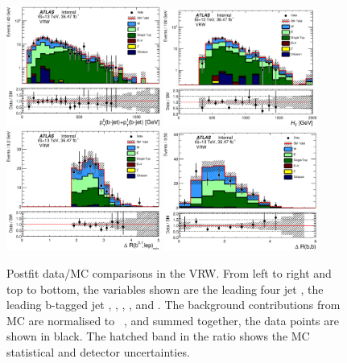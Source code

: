 \begin{figure}[!htb]
  \includegraphics[width=0.45\textwidth]{figures/wJets/postfit/JetPt_JetLeadTagIndex_JetPt_JetSubleadTagIndex__VRW_log.eps}
  \includegraphics[width=0.45\textwidth]{figures/wJets/postfit/Ht_VRW_log.eps}
  \includegraphics[width=0.45\textwidth]{figures/wJets/postfit/MinDRBLep_VRW.eps}
  \includegraphics[width=0.45\textwidth]{figures/wJets/postfit/DRBB_VRW.eps}
  \caption{Postfit data/MC comparisons in the VRW. From left to right and top to bottom, the variables shown are the leading four jet \pt, the leading b-tagged jet \pt, \HT, \htsig, \mindrblep, and \drbjetbjet. The background contributions from MC are normalised to \intlumi\ \ifb, and summed together, the data points are shown in black. The hatched band in the ratio shows the MC statistical and detector uncertainties.}
  \label{fig:VRWpts}
\end{figure}

